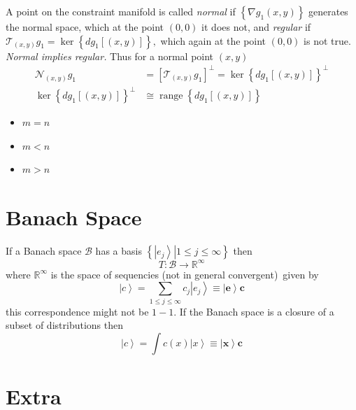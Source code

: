 \documentclass[aps,preprint]{revtex4}%
\begin{document}
A point on the constraint manifold is called \emph{normal }if $\left\{  \nabla
g_{1}\left(  x,y\right)  \right\}  $ generates the normal space, which at the
point $\left(  0,0\right)  $ it does not, and \emph{regular }if $\mathcal{T}%
_{\left(  x,y\right)  }g_{1}=\ker\left\{  dg_{1}\left[  \left(  x,y\right)
\right]  \right\}  ,$ which again at the point $\left(  0,0\right)  $ is not
true. \emph{Normal implies regular. }Thus for a normal point $\left(
x,y\right)  $
\begin{align}
\mathcal{N}_{\left(  x,y\right)  }g_{1}  &  =\left[  \mathcal{T}_{\left(
x,y\right)  }g_{1}\right]  ^{\bot}=\ker\left\{  dg_{1}\left[  \left(
x,y\right)  \right]  \right\}  ^{\bot}\nonumber\\
\ker\left\{  dg_{1}\left[  \left(  x,y\right)  \right]  \right\}  ^{\bot}  &
\cong\operatorname*{range}\left\{  dg_{1}\left[  \left(  x,y\right)  \right]
\right\}
\end{align}


\begin{itemize}
\item $m=n$
\end{itemize}

\begin{itemize}
\item $m<n$

\item $m>n$
\end{itemize}

\section{Banach Space}

If a Banach space $\mathcal{B}$ has a basis $\left\{  \left.  \left\vert
e_{j}\right\rangle \right\vert 1\leq j\leq\infty\right\}  $ then
\[
T:\mathcal{B}\rightarrow\mathbb{R}^{\infty}%
\]
where $\mathbb{R}^{\infty}$ is the space of sequencies (not in general
convergent)\ given by
\[
\left\vert c\right\rangle =\sum_{1\leq j\leq\infty}c_{j}\left\vert
e_{j}\right\rangle \equiv\left\vert \boldsymbol{e}\right\rangle \boldsymbol{c}%
\]
this correspondence might not be $1-1.$ If the Banach space is a closure of a
subset of distributions then
\[
\left\vert c\right\rangle =\int c\left(  x\right)  \left\vert x\right\rangle
\equiv\left\vert \boldsymbol{x}\right\rangle \boldsymbol{c}%
\]


\section{\bigskip Extra}
\end{document}

